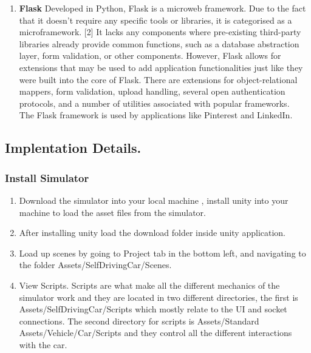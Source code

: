 \documentclass[ 12pt,a4paper,twocolumn,fleqn]{article}
\begin{document}
\begin{enumerate}
    \item \textbf{Flask}
     Developed in Python, Flask is a microweb framework. Due to the fact that it doesn't require any specific tools or libraries, it is categorised as a microframework. [2] It lacks any components where pre-existing third-party libraries already provide common functions, such as a database abstraction layer, form validation, or other components. However, Flask allows for extensions that may be used to add application functionalities just like they were built into the core of Flask. There are extensions for object-relational mappers, form validation, upload handling, several open authentication protocols, and a number of utilities associated with popular frameworks. \\
     The Flask framework is used by applications like Pinterest and LinkedIn.
\end{enumerate}

\subsection{ Implentation Details.}
\subsubsection{Install Simulator}
\begin{enumerate}
    \item Download the simulator into your local machine , install unity into your machine to load the asset files from the simulator.
    \item After installing unity load the download folder inside unity application. 
    \item Load up scenes by going to Project tab in the bottom left, and navigating to the folder Assets/SelfDrivingCar/Scenes.
    \item View Scripts. Scripts are what make all the different mechanics of the simulator work and they are located in two different directories, the first is Assets/SelfDrivingCar/Scripts which mostly relate to the UI and socket connections. The second directory for scripts is Assets/Standard Assets/Vehicle/Car/Scripts and they control all the different interactions with the car.
\end{enumerate}
\end{document}
